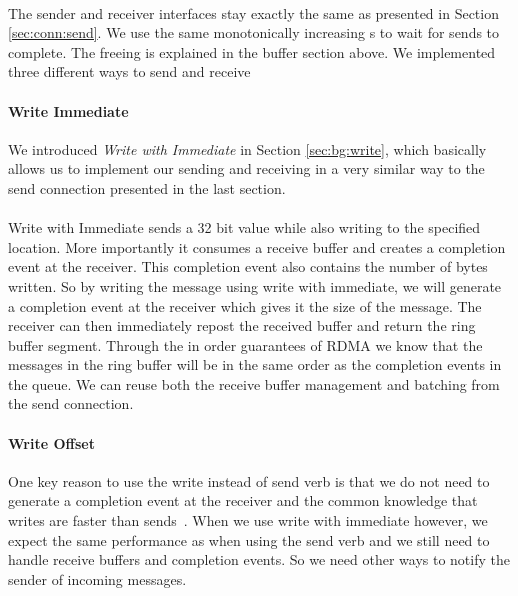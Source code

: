 \paragraph{}The sender and receiver interfaces stay exactly the same as presented in Section \ref{sec:conn:send}. We use the same 
monotonically increasing s to wait for sends to complete. The freeing is explained in the buffer section
above. We implemented three different ways to send and receive


\paragraph{Write Immediate}

We introduced \emph{Write with Immediate} in Section \ref{sec:bg:write}, which basically allows us to implement our sending 
and receiving in a very similar way to the send connection presented in the last section.

\paragraph{} Write with Immediate sends a 32 bit value while also writing to the specified location. More importantly it 
consumes a receive buffer and creates a completion event at the receiver. This completion event also contains the number 
of bytes written. So by writing the message using write with immediate, we will generate a completion event at the receiver
which gives it the size of the message. The receiver can then immediately repost the received buffer and return the ring 
buffer segment. Through the in order guarantees of RDMA we know that the messages in the ring buffer will be in the same
order as the completion events in the queue. We can reuse both the receive buffer management and batching from the send 
connection.


\paragraph{Write Offset}

One key reason to use the write instead of send verb is that we do not need to generate a completion event at the receiver
and the common knowledge that writes are faster than sends~\cite{}. When we use 
write with immediate however, we expect the same performance as when using the send verb and we still need to handle receive
buffers and completion events. So we need other ways to notify the sender of incoming messages.

